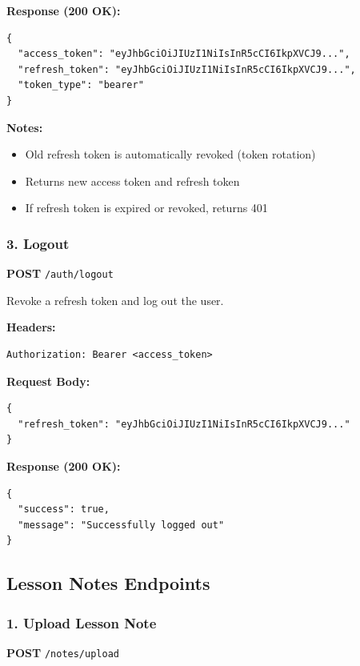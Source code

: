 \documentclass[12pt,a4paper,oneside]{article}
\begin{document}
\textbf{Response (200 OK):}
\begin{lstlisting}
{
  "access_token": "eyJhbGciOiJIUzI1NiIsInR5cCI6IkpXVCJ9...",
  "refresh_token": "eyJhbGciOiJIUzI1NiIsInR5cCI6IkpXVCJ9...",
  "token_type": "bearer"
}
\end{lstlisting}

\textbf{Notes:}
\begin{itemize}
    \item Old refresh token is automatically revoked (token rotation)
    \item Returns new access token and refresh token
    \item If refresh token is expired or revoked, returns 401
\end{itemize}

\subsubsection{3. Logout}

\textbf{POST} \texttt{/auth/logout}

Revoke a refresh token and log out the user.

\textbf{Headers:}
\begin{lstlisting}
Authorization: Bearer <access_token>
\end{lstlisting}

\textbf{Request Body:}
\begin{lstlisting}
{
  "refresh_token": "eyJhbGciOiJIUzI1NiIsInR5cCI6IkpXVCJ9..."
}
\end{lstlisting}

\textbf{Response (200 OK):}
\begin{lstlisting}
{
  "success": true,
  "message": "Successfully logged out"
}
\end{lstlisting}

\subsection{Lesson Notes Endpoints}

\subsubsection{1. Upload Lesson Note}

\textbf{POST} \texttt{/notes/upload}
\end{document}
